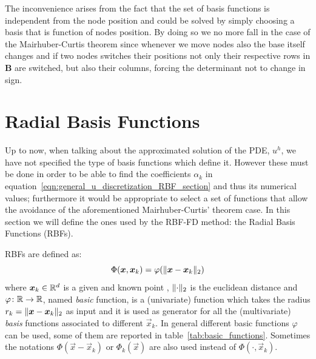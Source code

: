 The inconvenience arises from the fact that the set of basis functions is independent from the node position and could be solved by simply choosing a basis that is function of nodes position. By doing so we no more fall in the case of the Mairhuber-Curtis theorem since whenever we move nodes also the base itself changes and if two nodes switches their positions not only their respective rows in $\boldsymbol{B}$ are switched, but also their columns, forcing the determinant not to change in sign.




\section{Radial Basis Functions} \label{subsec:radial_basis_functions}
Up to now, when talking about the approximated solution of the PDE, $u^h$, we have not specified the type of basis functions which define it. However these must be done in order to be able to find the coefficients $\alpha_k$ in equation~\eqref{eqn:general_u_discretization_RBF_section} and thus its numerical values; furthermore it would be appropriate to select a set of functions that allow the avoidance of the aforementioned Mairhuber-Curtis' theorem case. In this section we will define the ones used by the RBF-FD method: the Radial Basis Functions (RBFs).

RBFs are defined as:
\begin{equation}
	\label{eq:RBF_definition}
	\Phi(\boldsymbol{x}, \boldsymbol{x}_k) = \varphi(\lVert\boldsymbol{x} - \boldsymbol{x}_k\rVert_2)
\end{equation}
where $\boldsymbol{x}_k \in \mathbb{R}^d$ is a given and known point , $\lVert\cdot\rVert_2$ is the euclidean distance and $\varphi\colon \mathbb{R} \to \mathbb{R}$, named \emph{basic} function, is a (univariate) function which takes the radius $r_k = \lVert\boldsymbol{x} - \boldsymbol{x}_k\rVert_2$ as input and it is used as generator for all the (multivariate) \emph{basis} functions associated to different $\vec{x}_k$. In general different basic functions $\varphi$ can be used, some of them are reported in table~\ref{tab:basic_functions}. Sometimes the notations $\Phi(\vec{x} - \vec{x}_k)$ or $\Phi_k({\vec{x}})$ are also used instead of $\Phi(\cdot, \vec{x}_k)$.

